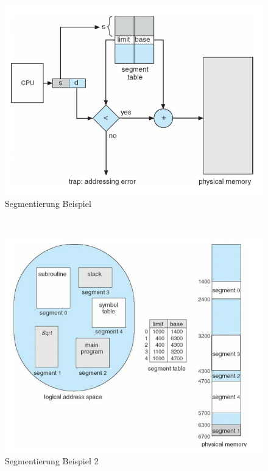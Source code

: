 \documentclass[a4paper]{scrreprt}
\begin{document}
\begin{itemize}
 \begin{figure}[ht]
\centering
\includegraphics[scale=0.30]{graphics/segmentierung1.png}
\caption{Segmentierung Beispiel}
\end{figure}
\ \\
\begin{figure}[ht]
\includegraphics[scale=0.30]{graphics/segmentierung2.png}
\caption{Segmentierung Beispiel 2}
\end{figure}
\end{itemize}
\ \\

\newpage
\end{document}
